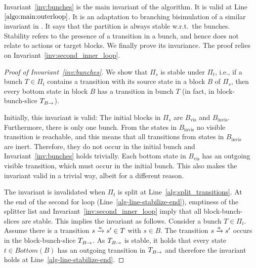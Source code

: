 \documentclass[a4paper,10pt]{article}
\theoremstyle{definition}
\theoremstyle{plain}
\newcommand{\pijl}[1]{\mathrel{\text{$\xrightarrow{\smash[t]{#1}}$}}}
\newcommand{\TB}{T_{B\pijl{}}}
\newcommand{\Bottom}{\mathit{Bottom}}
\begin{document}
%
Invariant~\ref{inv:bunches} is the main invariant of the algorithm. It is valid at Line~$\ref{algo:main:outerloop}$.
It is an adaptation to branching bisimulation of a similar invariant in \cite{Valmari2009}. It says that the
partition is always stable w.r.t.\ the bunches.
Stability refers to the presence of a transition in a bunch, and hence does not relate to actions or target blocks.
We finally prove its invariance.
The proof relies on Invariant~\ref{inv:second_inner_loop}.

\begin{proof}[Proof of Invariant~\ref{inv:bunches}]
We show that 	$\Pi_s$ is stable under $\Pi_t$, i.e.,
if a bunch $T \in \Pi_t$ contains a transition with its source state in a block $B$ of $\Pi_s$, then every bottom state in block $B$ has a transition in bunch
$T$ (in fact, in block-bunch-slice $\TB$).

Initially, this invariant is valid:
The initial blocks in $\Pi_s$ are $B_\text{vis}$ and $B_\text{invis}$.
Furthermore, there is only one bunch.
From the states in $B_\text{invis}$ no visible transition is reachable, and this means that all transitions from states in $B_\text{invis}$ are inert.
Therefore, they do not occur in the initial bunch and Invariant~\ref{inv:bunches} holds trivially.
Each bottom state in $B_\text{vis}$ has an outgoing visible transition, which must occur in the initial bunch.
This also makes the invariant valid in a trivial way, albeit for a different reason.

The invariant is invalidated when $\Pi_t$ is split at Line~\ref{alg:split_transitions}.
At the end of the second for loop (Line~\ref{alg-line-stabilize-end}),
emptiness of the splitter list and
Invariant~\ref{inv:second_inner_loop} imply
that all block-bunch-slices are stable.
This implies the invariant as follows.
Consider a bunch $T\in \Pi_t$.
Assume there is a transition $s\pijl{a}s'\in T$ with $s\in B$.
The transition $s\pijl{a}s'$ occurs in the block-bunch-slice $T_{B\pijl{}}$.
As $T_{B\pijl{}}$ is stable, it holds that every  state $t\in \Bottom(B)$ has an outgoing transition in $T_{B\pijl{}}$
and therefore the invariant holds at Line~\ref{alg-line-stabilize-end}.
\end{proof}
\end{document}
